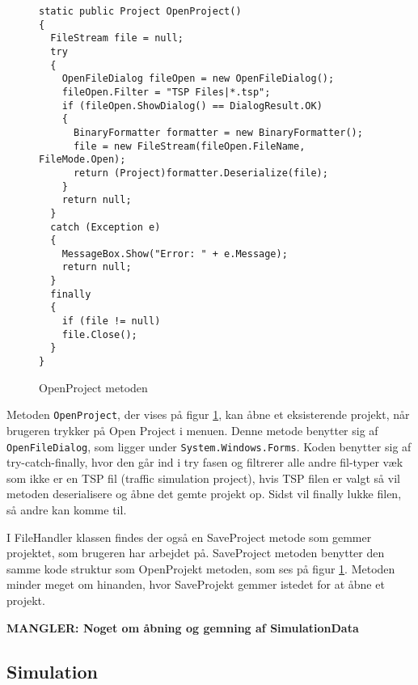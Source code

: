 \begin{figure}[H]
\begin{lstlisting}
static public Project OpenProject()
{
  FileStream file = null;
  try
  {
    OpenFileDialog fileOpen = new OpenFileDialog();
    fileOpen.Filter = "TSP Files|*.tsp";
    if (fileOpen.ShowDialog() == DialogResult.OK)
    {
      BinaryFormatter formatter = new BinaryFormatter();
      file = new FileStream(fileOpen.FileName, FileMode.Open);
      return (Project)formatter.Deserialize(file);
    }
    return null;
  }
  catch (Exception e)
  {
    MessageBox.Show("Error: " + e.Message);
    return null;
  }
  finally
  {
    if (file != null)
    file.Close();
  }
}
\end{lstlisting}
\caption{OpenProject metoden}\label{OpenProjectCode}
\end{figure}

Metoden \texttt{OpenProject}, der vises på figur \ref{OpenProjectCode}, kan åbne et eksisterende projekt, når brugeren trykker på Open Project i menuen. Denne metode benytter sig af \texttt{OpenFileDialog}, som ligger under \texttt{System.Windows.Forms}. Koden benytter sig af try-catch-finally, hvor den går ind i try fasen og filtrerer alle andre fil-typer væk som ikke er en TSP fil (traffic simulation project), hvis TSP filen er valgt så vil metoden deserialisere og åbne det gemte projekt op. Sidst vil finally lukke filen, så andre kan komme til.

\vspace{5mm}

I FileHandler klassen findes der også en SaveProject metode som gemmer projektet, som brugeren har arbejdet på. SaveProject metoden benytter den samme kode struktur som OpenProjekt metoden, som ses på figur \ref{OpenProjectCode}. Metoden minder meget om hinanden, hvor SaveProjekt gemmer istedet for at åbne et projekt.

\vspace{5mm}

\textbf{MANGLER: Noget om åbning og gemning af SimulationData}

\subsection{Simulation}\label{SimulationClass}